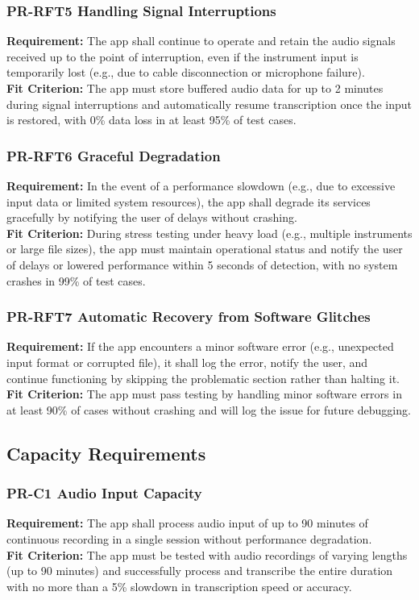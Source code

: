 \documentclass[12pt]{article}
\begin{document}
\subsubsection*{PR-RFT5 Handling Signal Interruptions} \label{PR-RFT5}
\textbf{Requirement:} The app shall continue to operate and retain the audio signals received up to the point of interruption, even if the instrument input is temporarily lost (e.g., due to cable disconnection or microphone failure).\\
\textbf{Fit Criterion:} The app must store buffered audio data for up to 2 minutes during signal interruptions and automatically resume transcription once the input is restored, with 0\% data loss in at least 95\% of test cases.
\subsubsection*{PR-RFT6 Graceful Degradation} \label{PR-RFT6}
\textbf{Requirement:} In the event of a performance slowdown (e.g., due to excessive input data or limited system resources), the app shall degrade its services gracefully by notifying the user of delays without crashing.\\
\textbf{Fit Criterion:} During stress testing under heavy load (e.g., multiple instruments or large file sizes), the app must maintain operational status and notify the user of delays or lowered performance within 5 seconds of detection, with no system crashes in 99\% of test cases.
\subsubsection*{PR-RFT7 Automatic Recovery from Software Glitches} \label{PR-RFT7}
\textbf{Requirement:} If the app encounters a minor software error (e.g., unexpected input format or corrupted file), it shall log the error, notify the user, and continue functioning by skipping the problematic section rather than halting it.\\
\textbf{Fit Criterion:} The app must pass testing by handling minor software errors in at least 90\% of cases without crashing and will log the issue for future debugging.

\subsection{Capacity Requirements}
\subsubsection*{PR-C1 Audio Input Capacity} \label{PR-C1}
\textbf{Requirement:} The app shall process audio input of up to 90 minutes of continuous recording in a single session without performance degradation.\\
\textbf{Fit Criterion:} The app must be tested with audio recordings of varying lengths (up to 90 minutes) and successfully process and transcribe the entire duration with no more than a 5\% slowdown in transcription speed or accuracy.
\end{document}
